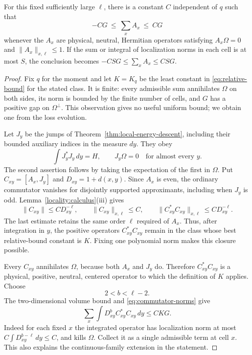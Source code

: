 \begin{proposition}\label{prop:relative-bound}
For this fixed sufficiently large $\ell$, there is a constant $C$
independent of $q$ such that
\begin{equation}\label{eq:relative-bound}
 -CG\ \le\ \sum_x A_x\ \le\ CG
\end{equation}
whenever the $A_x$ are physical, neutral, Hermitian operators satisfying
$A_x\Omega=0$ and $\|A_x\|_{x,\ell}\le1$.
If the sum or integral of localization norms in each cell is at most
$S$, the conclusion becomes $-CSG\le\sum_xA_x\le CSG$.
\end{proposition}

\begin{proof}
Fix $q$ for the moment and let $K=K_q$ be the least constant in
\eqref{eq:relative-bound} for the stated class. It is finite: every
admissible sum annihilates $\Omega$ on both sides, its norm is bounded
by the finite number of cells, and $G$ has a positive gap on
$\Omega^\perp$. This observation gives no useful uniform bound;
we obtain one from the loss evolution.

Let $J_y$ be the jumps of Theorem~\ref{thm:local-energy-descent},
including their bounded auxiliary indices in the measure $dy$.
They obey
\[
 \int J_y^*J_y\,dy=H,
 \qquad J_y\Omega=0\quad\text{for almost every }y.
\]
The second assertion follows by taking the expectation of the first
in $\Omega$. Put $C_{xy}=[A_x,J_y]$ and
$D_{xy}=1+d(x,y)$. Since $A_x$ is even, the ordinary commutator
vanishes for disjointly supported approximants, including when $J_y$
is odd. Lemma~\ref{locality:calculus}(iii) gives
\begin{equation}\label{eq:commutator-norms}
 \|C_{xy}\|\le C D_{xy}^{-\ell},
 \qquad \|C_{xy}\|_{x,\ell}\le C,
 \qquad
 \|C_{xy}^*C_{xy}\|_{x,\ell}\le C D_{xy}^{-\ell}.
\end{equation}
The last estimate retains the same order $\ell$ required of $A_x$.
Thus, after integration in $y$, the positive operators
$C_{xy}^*C_{xy}$ remain in the class whose best relative-bound constant
is $K$. Fixing one polynomial norm makes this closure possible.

Every $C_{xy}$ annihilates $\Omega$, because both $A_x$ and $J_y$
do. Therefore $C_{xy}^*C_{xy}$ is a physical, positive, neutral,
centered operator to which the definition of $K$ applies. Choose
\begin{equation}\label{eq:distance-weight-choice}
 2<b<\ell-2.
\end{equation}
The two-dimensional volume bound and \eqref{eq:commutator-norms}
give
\begin{equation}\label{eq:squared-commutator-sum}
 \sum_x\int D_{xy}^{b}C_{xy}^*C_{xy}\,dy\le C K G.
\end{equation}
Indeed for each fixed $x$ the integrated operator has localization
norm at most $C\int D_{xy}^{b-\ell}\,dy\le C$, and kills
$\Omega$. Collect it as a single admissible term at cell $x$.
This also explains the continuous-family extension in the statement.


\end{proof}
